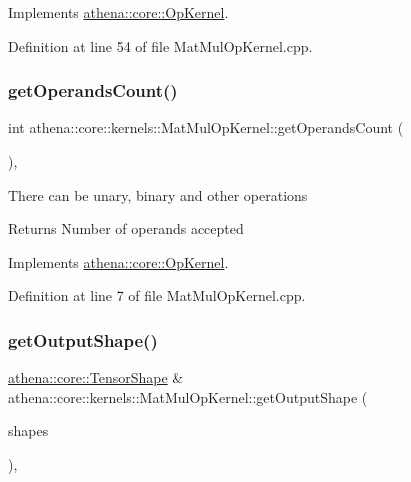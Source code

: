 Implements \mbox{\hyperlink{classathena_1_1core_1_1_op_kernel_ad95af6dd184ce7ee9182ec7ca54b6c4d}{athena\+::core\+::\+Op\+Kernel}}.



Definition at line 54 of file Mat\+Mul\+Op\+Kernel.\+cpp.

\mbox{\label{classathena_1_1core_1_1kernels_1_1_mat_mul_op_kernel_a75f9e43d1fcecaf9260af31c68cd69db}} 
\subsubsection{\texorpdfstring{get\+Operands\+Count()}{getOperandsCount()}}
{\footnotesize\ttfamily int athena\+::core\+::kernels\+::\+Mat\+Mul\+Op\+Kernel\+::get\+Operands\+Count (\begin{DoxyParamCaption}{ }\end{DoxyParamCaption})\hspace{0.3cm}{\ttfamily [override]}, {\ttfamily [virtual]}}

There can be unary, binary and other operations \begin{DoxyReturn}{Returns}
Number of operands accepted 
\end{DoxyReturn}


Implements \mbox{\hyperlink{classathena_1_1core_1_1_op_kernel_add97d4c132d80ecd9915acfedf7c9119}{athena\+::core\+::\+Op\+Kernel}}.



Definition at line 7 of file Mat\+Mul\+Op\+Kernel.\+cpp.

\mbox{\label{classathena_1_1core_1_1kernels_1_1_mat_mul_op_kernel_a3a397257c208f55ba5fba4018112a605}} 
\subsubsection{\texorpdfstring{get\+Output\+Shape()}{getOutputShape()}}
{\footnotesize\ttfamily \mbox{\hyperlink{classathena_1_1core_1_1_tensor_shape}{athena\+::core\+::\+Tensor\+Shape}} \& athena\+::core\+::kernels\+::\+Mat\+Mul\+Op\+Kernel\+::get\+Output\+Shape (\begin{DoxyParamCaption}\item[{std\+::vector$<$ \mbox{\hyperlink{classathena_1_1core_1_1_tensor_shape}{athena\+::core\+::\+Tensor\+Shape}} $>$ \&}]{shapes }\end{DoxyParamCaption})\hspace{0.3cm}{\ttfamily [override]}, {\ttfamily [virtual]}}

